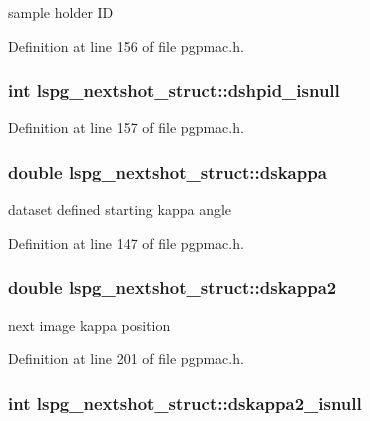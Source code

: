 sample holder ID 

Definition at line 156 of file pgpmac.h.\hypertarget{structlspg__nextshot__struct_afe16be0382423aa3f25cb3d6cf99430b}{
\subsubsection[{dshpid\_\-isnull}]{\setlength{\rightskip}{0pt plus 5cm}int {\bf lspg\_\-nextshot\_\-struct::dshpid\_\-isnull}}}
\label{structlspg__nextshot__struct_afe16be0382423aa3f25cb3d6cf99430b}


Definition at line 157 of file pgpmac.h.\hypertarget{structlspg__nextshot__struct_a59355281e8eb935cd7bfac597fdc5289}{
\subsubsection[{dskappa}]{\setlength{\rightskip}{0pt plus 5cm}double {\bf lspg\_\-nextshot\_\-struct::dskappa}}}
\label{structlspg__nextshot__struct_a59355281e8eb935cd7bfac597fdc5289}


dataset defined starting kappa angle 

Definition at line 147 of file pgpmac.h.\hypertarget{structlspg__nextshot__struct_a8571a0b95fb6ea6356fd7204b9c9e371}{
\subsubsection[{dskappa2}]{\setlength{\rightskip}{0pt plus 5cm}double {\bf lspg\_\-nextshot\_\-struct::dskappa2}}}
\label{structlspg__nextshot__struct_a8571a0b95fb6ea6356fd7204b9c9e371}


next image kappa position 

Definition at line 201 of file pgpmac.h.\hypertarget{structlspg__nextshot__struct_a9a7e47372f4f6e0e48a0cb3c78fa8437}{
\subsubsection[{dskappa2\_\-isnull}]{\setlength{\rightskip}{0pt plus 5cm}int {\bf lspg\_\-nextshot\_\-struct::dskappa2\_\-isnull}}}
\label{structlspg__nextshot__struct_a9a7e47372f4f6e0e48a0cb3c78fa8437}


